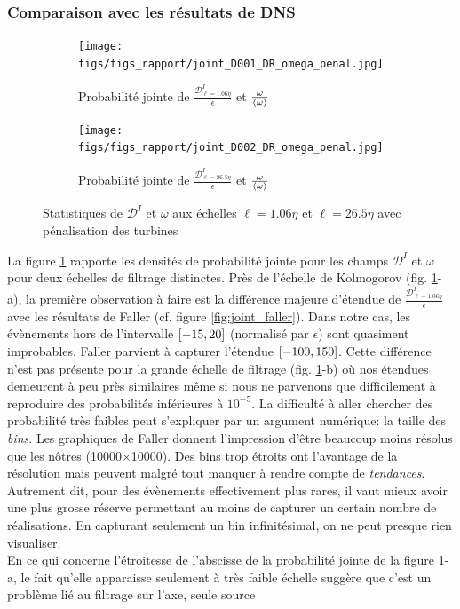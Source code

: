 \documentclass[13pt, a4paper]{extarticle}
\begin{document}
\subsubsection{Comparaison avec les résultats de DNS} %
\begin{figure}[H]
  \centering
  \begin{subfigure}[b]{0.48\linewidth}
  \centering
  \texttt{[image: figs/figs\_rapport/joint\_D001\_DR\_omega\_penal.jpg]}
  \caption{Probabilité jointe de $\frac{\mathscr{D}^I_{\ell=1.06\eta}}{\epsilon}$ et 
  $\frac{\omega}{\left\langle \omega\right\rangle}$}
  \end{subfigure}
  \begin{subfigure}[b]{0.48\linewidth}
    \centering
    \texttt{[image: figs/figs\_rapport/joint\_D002\_DR\_omega\_penal.jpg]}
    \caption{Probabilité jointe de $\frac{\mathscr{D}^I_{\ell=26.5\eta}}{\epsilon}$ et 
    $\frac{\omega}{\left\langle \omega\right\rangle}$}
    \end{subfigure}
  \caption{Statistiques de $\mathscr{D}^I$ et $\omega$ aux échelles $\ell=1.06\eta$ et 
  $\ell=26.5\eta$
           avec pénalisation des turbines}
  \label{fig:DR_penal}
\end{figure}
\noindent La figure \ref{fig:DR_penal} rapporte les densités de probabilité jointe 
pour les champs $\mathscr{D}^I$ et $\omega$ pour deux échelles de filtrage distinctes. 
Près de l'échelle de Kolmogorov (fig. \ref{fig:DR_penal}-a), la première observation 
à faire est la différence majeure d'étendue de 
$\frac{\mathscr{D}^I_{\ell=1.06\eta}}{\epsilon}$ avec les résultats de Faller 
(cf. figure \ref{fig:joint_faller}). Dans notre cas, les évènements hors de 
l'intervalle $\qty[-15,20]$ (normalisé par $\epsilon$) sont quasiment improbables. 
Faller parvient à capturer l'étendue $\qty[-100,150]$. 
Cette différence n'est pas présente pour la grande échelle de filtrage 
(fig. \ref{fig:DR_penal}-b) où nos étendues demeurent à peu près similaires 
même si nous ne parvenons que difficilement à reproduire des probabilités 
inférieures à $10^{-5}$. La difficulté à aller chercher des probabilité très 
faibles peut s'expliquer par un argument numérique: la taille des \emph{bins}. 
Les graphiques de Faller donnent l'impression d'être beaucoup moins résolus que 
les nôtres (10000$\times$10000). Des bins trop étroits ont l'avantage de la 
résolution mais peuvent malgré tout manquer à rendre compte de \emph{tendances}. 
Autrement dit, pour des évènements effectivement plus rares, il vaut mieux avoir 
une plus grosse réserve permettant au moins de capturer un certain nombre de 
réalisations. En capturant seulement un bin infinitésimal, on ne peut presque rien visualiser. \\
En ce qui concerne l'étroitesse de l'abscisse de la probabilité jointe de la 
figure \ref{fig:DR_penal}-a, le fait qu'elle apparaisse seulement à très faible
 échelle suggère que c'est un problème lié au filtrage sur l'axe, seule source 
 
\end{document}
